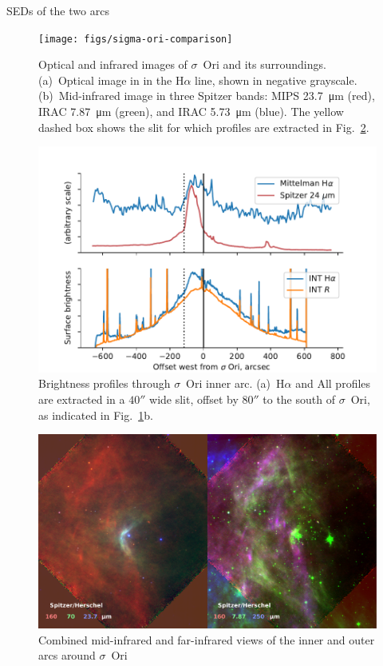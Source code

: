 \documentclass[useAMS, usenatbib, a4paper]{mnras}
\begin{document}
SEDs of the two arcs

\begin{figure}
  \centering
  \texttt{[image: figs/sigma-ori-comparison]}
  \caption{Optical and infrared images of $\sigma$~Ori and its
    surroundings.  (a)~Optical image in in the H\(\alpha\) line, shown in
    negative grayscale.  (b)~Mid-infrared image in three Spitzer
    bands: MIPS \SI{23.7}{\um} (red), IRAC \SI{7.87}{\um} (green), and
    IRAC \SI{5.73}{\um} (blue).  The yellow dashed box shows the slit
    for which profiles are extracted in Fig.~\ref{fig:sig-ori-cuts}.}
  \label{fig:sig-ori}
\end{figure}

\begin{figure}
  \centering
  \includegraphics[width=\linewidth]{figs/sigma-ori-eastwest-cuts}
  \caption{Brightness profiles through $\sigma$~Ori inner arc.  (a)~H\(\alpha\) and  All
    profiles are extracted in a \(40''\) wide slit, offset by \(80''\)
    to the south of \(\sigma\)~Ori, as indicated in
    Fig.~\ref{fig:sig-ori}b. }
  \label{fig:sig-ori-cuts}
\end{figure}

\begin{figure}
  \centering
  \includegraphics[width=\linewidth]{figs/sigma-ori-inner-outer}
  \caption{Combined mid-infrared and far-infrared views of the inner
    and outer arcs around $\sigma$~Ori}
  \label{fig:sig-ori-outer}
\end{figure}
\end{document}
